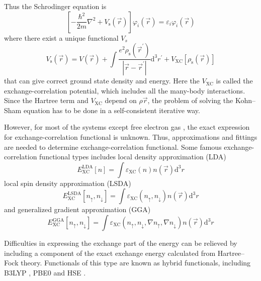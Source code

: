 Thus the Schrodinger equation is 
\begin{equation}
\left[-\frac{\hbar^{2}}{2 m} \nabla^{2}+V_{\mathrm{s}}(\vec{r})\right] \varphi_{i}(\vec{r})=\varepsilon_{i} \varphi_{i}(\vec{r})
\end{equation}
where there exist a unique functional $V_s$
\begin{equation}
V_{\mathrm{s}}(\vec{r})=V(\vec{r})+\int \frac{e^{2} \rho_{\mathrm{s}}\left(\vec{r}^{\prime}\right)}{|\vec{r}-\vec{r}^{\prime}|} \mathrm{d}^{3} r^{\prime}+V_{\mathrm{XC}}\left[\rho_{\mathrm{s}}(\vec{r})\right]
\end{equation}
that can give correct ground state density and energy.
Here the $V_{\mathrm{XC}}$ is called the exchange-correlation potential, which includes all the many-body interactions.
Since the Hartree term and $V_{\mathrm{XC}}$ depend on $\rho{\vec{r}}$, the problem of solving the Kohn–Sham equation has to be done in a self-consistent iterative way.

However, for most of the systems except free electron gas \cite{homogeneous}, the exact expression for exchange-correlation functional is unknown.
Thus, approximations and fittings are needed to determine exchange-correlation functional.
Some famous exchange-correlation functional types includes local density approximation (LDA)
\begin{equation}
E_{\mathrm{XC}}^{\mathrm{LDA}}[n]=\int \varepsilon_{\mathrm{XC}}(n) n(\vec{r}) \mathrm{d}^{3} r
\end{equation}
local spin density approximation (LSDA) 
\begin{equation}
E_{\mathrm{XC}}^{\mathrm{LSDA}}\left[n_{\uparrow}, n_{\downarrow}\right]=\int \varepsilon_{\mathrm{XC}}\left(n_{\uparrow}, n_{\downarrow}\right) n(\vec{r}) \mathrm{d}^{3} r
\end{equation}
and generalized gradient approximation (GGA)
\begin{equation}
E_{\mathrm{XC}}^{\mathrm{GGA}}\left[n_{\uparrow}, n_{\downarrow}\right]=\int \varepsilon_{\mathrm{XC}}\left(n_{\uparrow}, n_{\downarrow}, \nabla n_{\uparrow}, \nabla n_{\downarrow}\right) n(\vec{r}) \mathrm{d}^{3} r
\end{equation}

Difficulties in expressing the exchange part of the energy can be relieved by including a component of the exact exchange energy calculated from Hartree–Fock theory.
Functionals of this type are known as hybrid functionals, including B3LYP \cite{b3lyp}, PBE0 \cite{pbe0} and HSE \cite{hse}.

